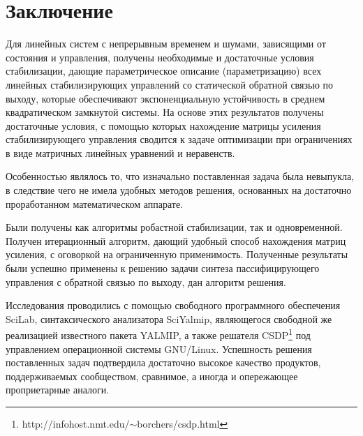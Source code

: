 \chapter*{Заключение}

Для линейных систем с непрерывным временем и шумами, зависящими от состояния и управления, получены необходимые и достаточные условия стабилизации, дающие параметрическое описание (параметризацию) всех линейных стабилизирующих управлений со статической обратной связью по выходу, которые обеспечивают экспоненциальную устойчивость в среднем квадратическом замкнутой системы. На основе этих результатов получены достаточные условия, с помощью которых нахождение матрицы усиления стабилизирующего управления сводится к задаче оптимизации при ограничениях в виде матричных линейных уравнений и неравенств.

Особенностью являлось то, что изначально поставленная задача была невыпукла, в следствие чего не имела удобных методов решения, основанных на достаточно проработанном математическом аппарате.\br

Были получены как алгоритмы робастной стабилизации, так и одновременной. Получен итерационный алгоритм, дающий удобный способ нахождения матриц усиления, с оговоркой на ограниченную применимость. Полученные результаты были успешно применены к решению задачи синтеза пассифицирующего управления с обратной связью по выходу, дан алгоритм решения.\br

Исследования проводились с помощью свободного программного обеспечения SciLab, синтаксического анализатора SciYalmip, являющегося свободной же реализацией известного пакета YALMIP, а также решателя CSDP\footnote{{\selectfont http://infohost.nmt.edu/$\sim$borchers/csdp.html}} под управлением операционной системы GNU/Linux. Успешность решения поставленных задач подтвердила достаточно высокое качество продуктов, поддерживаемых сообществом, сравнимое, а иногда и опережающее проприетарные аналоги.
